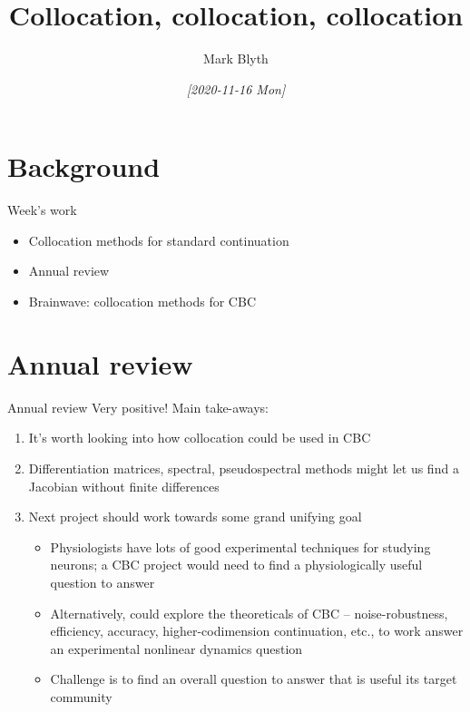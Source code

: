 \documentclass[presentation]{beamer}
\author{Mark Blyth}
\date{\textit{[2020-11-16 Mon]}}
\title{Collocation, collocation, collocation}
\begin{document}
\maketitle

\section{Background}
\label{sec:orgc9b820c}
\begin{frame}[label={sec:orgaea0849}]{Week's work}
\begin{itemize}
\item Collocation methods for standard continuation
\end{itemize}
\vfill
\begin{itemize}
\item Annual review
\end{itemize}
\vfill
\begin{itemize}
\item Brainwave: collocation methods for CBC
\end{itemize}
\end{frame}

\section{Annual review}
\label{sec:org36a7aaf}
\begin{frame}[label={sec:org04ca75d}]{Annual review}
Very positive! Main take-aways:
\vfill
\begin{enumerate}
\item It's worth looking into how collocation could be used in CBC
\item Differentiation matrices, spectral, pseudospectral methods might let us find a Jacobian without finite differences
\item Next project should work towards some grand unifying goal
\begin{itemize}
\item Physiologists have lots of good experimental techniques for studying neurons; a CBC project would need to find a physiologically useful question to answer
\item Alternatively, could explore the theoreticals of CBC -- noise-robustness, efficiency, accuracy, higher-codimension continuation, etc., to work answer an experimental nonlinear dynamics question
\item Challenge is to find an overall question to answer that is useful its target community
\end{itemize}
\end{enumerate}
\end{frame}
\end{document}
